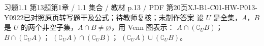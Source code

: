 \par\noindent\begin{minipage}{\linewidth}
\begin{bankitem}{习题1.1 第13题}{第1章 / 1.1 集合 / 教材 p.13 / PDF 第20页}{XJ-B1-C01-HW-P013-Y0922}{已对照原页转写题干及公式；待教师复核；未制作答案}
设 $U$ 是全集，$A$，$B$ 是 $U$ 的两个非空子集，$A\cap B\ne\varnothing$，用 Venn 图表示：
$A\cap(\complement_U B)$；
$B\cap(\complement_U A)$；
$(\complement_U A)\cap(\complement_U B)$；
$(\complement_U A)\cup(\complement_U B)$。
\end{bankitem}
\end{minipage}\par\medskip
